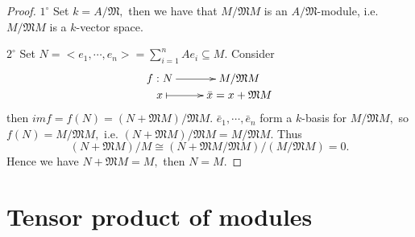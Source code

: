 \begin{proof}
$\mathit{1^{\circ}}$ Set $k=A/\mathfrak{M},$ then we have that
$M/\mathfrak{M}M$ is an $A/\mathfrak{M}$-module, i.e.
$M/\mathfrak{M}M$ is a $k$-vector space.

$\mathit{2^{\circ}}$ Set $N = <e_1,\cdots,e_n> = \sum\limits_{i=1}^n
Ae_i\subseteq M.$ Consider
\[ \xymatrix@R=0em{
   f: N \ar[r] & M/\mathfrak{M}M  \\
   x \ar@{|->}[r] & \bar{x}=x+\mathfrak{M}M }  \]
then $imf=f(N)=(N+\mathfrak{M}M)/\mathfrak{M}M.$
$\bar{e}_1,\cdots,\bar{e}_n$ form a $k$-basis for $M/\mathfrak{M}M,$
so $f(N)=M/\mathfrak{M}M,$ i.e. $(N+\mathfrak{M}M)/\mathfrak{M}M =
M/\mathfrak{M}M.$ Thus
$$(N+\mathfrak{M}M)/M\cong
(N+\mathfrak{M}M/\mathfrak{M}M)/(M/\mathfrak{M}M) = 0.$$ Hence we
have $N+\mathfrak{M}M=M,$ then $N=M.$
\end{proof}

\newpage

\section{Tensor product of modules}

